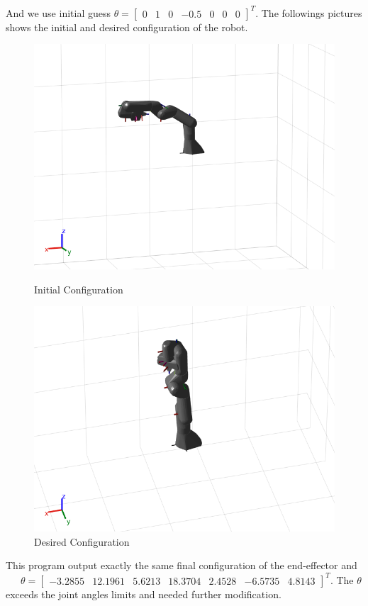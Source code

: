 \documentclass[english,10pt,a4paper]{article}
\begin{document}
    And we use initial guess \(\theta = \begin{bmatrix}
        0 & 1 & 0 & -0.5 & 0 & 0 & 0 \end{bmatrix}^T\). The followings pictures shows the initial and desired configuration of the robot.
    \begin{figure}[H]
        \centering
        \begin{minipage}{0.45\textwidth}
            \centering
            \includegraphics[width=\textwidth]{ph2a.png} %
            \caption{Initial Configuration}
            \label{fig:ph2a}
        \end{minipage}
        \hfill
        \begin{minipage}{0.45\textwidth}
        \centering
            \includegraphics[width=\textwidth]{ph2b.png} %
            \caption{Desired Configuration}
            \label{fig:ph2b}
        \end{minipage}
    \end{figure}
    This program output exactly the same final configuration of the end-effector and \ \ \ \(\theta = \begin{bmatrix} -3.2855 & 12.1961 & 5.6213 & 18.3704 & 2.4528 & -6.5735 & 4.8143 \end{bmatrix}^T\). The \(\theta\) exceeds the joint angles limits and needed further modification.
\end{document}
